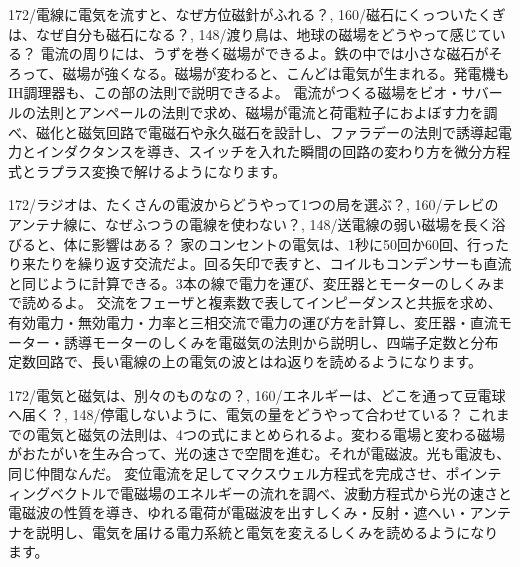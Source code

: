 \makeatletter{}\makeatother
{}%
  {172/{電線に電気を流すと、なぜ方位磁針がふれる？},
   160/{磁石にくっついたくぎは、なぜ自分も磁石になる？},
   148/{渡り鳥は、地球の磁場をどうやって感じている？}}%
  {電流の周りには、うずを巻く磁場ができるよ。鉄の中では小さな磁石がそろって、磁場が強くなる。磁場が変わると、こんどは電気が生まれる。発電機もIH調理器も、この部の法則で説明できるよ。}%
  {電流がつくる磁場をビオ・サバールの法則とアンペールの法則で求め、磁場が電流と荷電粒子におよぼす力を調べ、磁化と磁気回路で電磁石や永久磁石を設計し、ファラデーの法則で誘導起電力とインダクタンスを導き、スイッチを入れた瞬間の回路の変わり方を微分方程式とラプラス変換で解けるようになります。}

\makeatletter{}\makeatother%
%
  {172/{ラジオは、たくさんの電波からどうやって1つの局を選ぶ？},
   160/{テレビのアンテナ線に、なぜふつうの電線を使わない？},
   148/{送電線の弱い磁場を長く浴びると、体に影響はある？}}%
  {家のコンセントの電気は、1秒に50回か60回、行ったり来たりを繰り返す交流だよ。回る矢印で表すと、コイルもコンデンサーも直流と同じように計算できる。3本の線で電力を運び、変圧器とモーターのしくみまで読めるよ。}%
  {交流をフェーザと複素数で表してインピーダンスと共振を求め、有効電力・無効電力・力率と三相交流で電力の運び方を計算し、変圧器・直流モーター・誘導モーターのしくみを電磁気の法則から説明し、四端子定数と分布定数回路で、長い電線の上の電気の波とはね返りを読めるようになります。}

%
  {172/{電気と磁気は、別々のものなの？},
   160/{エネルギーは、どこを通って豆電球へ届く？},
   148/{停電しないように、電気の量をどうやって合わせている？}}%
  {これまでの電気と磁気の法則は、4つの式にまとめられるよ。変わる電場と変わる磁場がおたがいを生み合って、光の速さで空間を進む。それが電磁波。光も電波も、同じ仲間なんだ。}%
  {変位電流を足してマクスウェル方程式を完成させ、ポインティングベクトルで電磁場のエネルギーの流れを調べ、波動方程式から光の速さと電磁波の性質を導き、ゆれる電荷が電磁波を出すしくみ・反射・遮へい・アンテナを説明し、電気を届ける電力系統と電気を変えるしくみを読めるようになります。}



